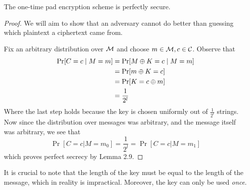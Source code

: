 \begin{theorem}
    The one-time pad encryption scheme is perfectly secure.
\end{theorem}
\begin{proof}
    We will aim to show that an adversary cannot do better than guessing which plaintext a ciphertext came from.

    Fix an arbitrary distribution over $\mathcal M$ and choose $m \in \mathcal M, c \in \mathcal C$. Observe that
    \begin{align*}
        \Pr[C = c \mid M = m] &= \Pr[M \oplus K = c \mid M = m]\\
                             &= \Pr[m \oplus K = c]\\
                             &= \Pr[K = c \oplus m]\\
                             &= \frac{1}{2^l}
    \end{align*}
    Where the last step holds because the key is chosen uniformly out of $\frac{1}{2^l}$ strings. Now since the distribution over messages was arbitrary, and the message itself was arbitrary, we see that 
    \[ \Pr[C = c | M = m_0] = \frac{1}{2^l} = \Pr[C = c | M = m_1]\]
    which proves perfect secrecy by Lemma 2.9.
\end{proof}

It is crucial to note that the length of the key must be equal to the length of the message, which in reality is impractical. Moreover, the key can only be used \textit{once}.

